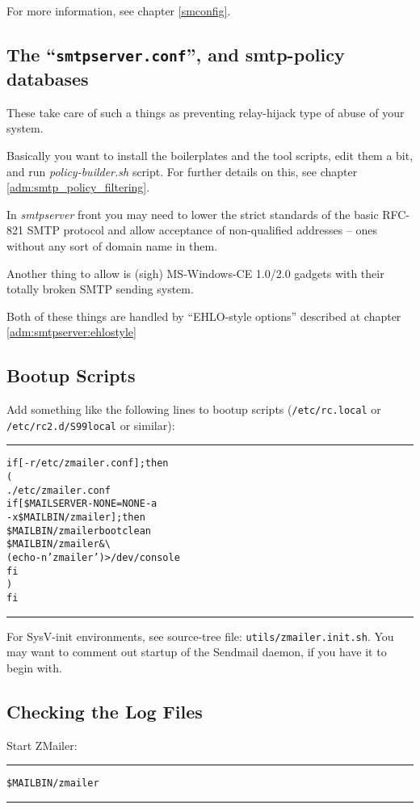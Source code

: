 For more information, see chapter \vref{smconfig}.


\subsection{The ``{\tt smtpserver.conf}'', and smtp-policy databases}

These take care of such a things as preventing relay-hijack type
of abuse of your system.

Basically you want to install the boilerplates and the tool scripts,
edit them a bit, and run {\em policy-builder.sh} script.
For further details on this, see chapter \vref{adm:smtp_policy_filtering}.

In {\em smtpserver} front you may need to lower the strict standards
of the basic RFC-821 SMTP protocol and allow acceptance of non-qualified
addresses -- ones without any sort of domain name in them.

Another thing to allow is (sigh) MS-Windows-CE 1.0/2.0 gadgets with
their totally broken SMTP sending system.

Both of these things are handled by ``EHLO-style options'' described
at chapter \vref{adm:smtpserver:ehlostyle}

\subsection{Bootup Scripts}

Add something like the following lines to bootup scripts ({\tt /etc/rc.local}
or {\tt /etc/rc2.d/S99local} or similar):
\begin{alltt}\medskip\hrule\medskip
if [ -r /etc/zmailer.conf ]; then
(
  . /etc/zmailer.conf
  if [ \${MAILSERVER-NONE} = NONE -a
       -x \$MAILBIN/zmailer ]; then
    \$MAILBIN/zmailer bootclean
    \$MAILBIN/zmailer & \verb/\/
      (echo -n ' zmailer') >/dev/console
  fi
)
fi
\medskip\hrule\end{alltt}\medskip


For SysV-init environments, see source-tree file: {\tt utils/zmailer.init.sh}.
You may want to comment out startup of the Sendmail daemon,
if you have it to begin with.


\subsection{Checking the Log Files}

Start ZMailer:
\begin{alltt}\medskip\hrule\medskip
  \$MAILBIN/zmailer
\medskip\hrule\end{alltt}\medskip



